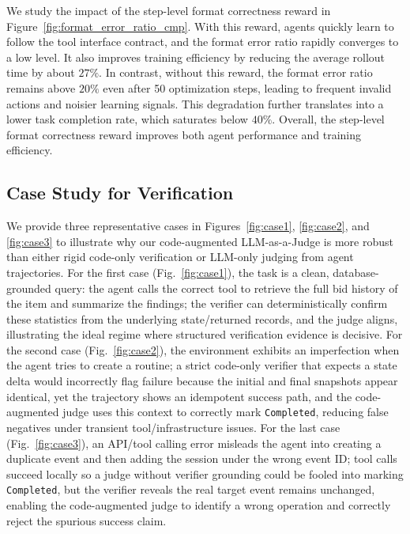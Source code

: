   

We study the impact of the step-level format correctness reward in Figure~\ref{fig:format_error_ratio_cmp}.
With this reward, agents quickly learn to follow the tool interface contract, and the format error ratio rapidly converges to a low level.
It also improves training efficiency by reducing the average rollout time by about $27\%$.
In contrast, without this reward, the format error ratio remains above $20\%$ even after 50 optimization steps, leading to frequent invalid actions and noisier learning signals.
This degradation further translates into a lower task completion rate, which saturates below $40\%$.
Overall, the step-level format correctness reward improves both agent performance and training efficiency.


\subsection{Case Study for Verification} \label{appendix:case_study_for_verification}
We provide three representative cases in Figures~\ref{fig:case1}, \ref{fig:case2}, and \ref{fig:case3} to illustrate why our code-augmented LLM-as-a-Judge is more robust than either rigid code-only verification or LLM-only judging from agent trajectories.
For the first case (Fig.~\ref{fig:case1}), the task is a clean, database-grounded query: the agent calls the correct tool to retrieve the full bid history of the item and summarize the findings; the verifier can deterministically confirm these statistics from the underlying state/returned records, and the judge aligns, illustrating the ideal regime where structured verification evidence is decisive. 
For the second case (Fig.~\ref{fig:case2}), the environment exhibits an imperfection when the agent tries to create a routine; a strict code-only verifier that expects a state delta would incorrectly flag failure because the initial and final snapshots appear identical, yet the trajectory shows an idempotent success path, and the code-augmented judge uses this context to correctly mark \texttt{Completed}, reducing false negatives under transient tool/infrastructure issues. 
For the last case (Fig.~\ref{fig:case3}), an API/tool calling error misleads the agent into creating a duplicate event and then adding the session under the wrong event ID; tool calls succeed locally so a judge without verifier grounding could be fooled into marking \texttt{Completed}, but the verifier reveals the real target event remains unchanged, enabling the code-augmented judge to identify a wrong operation and correctly reject the spurious success claim.

